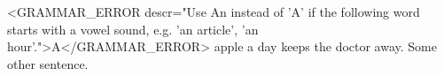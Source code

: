 
    <GRAMMAR_ERROR descr="Use An instead of 'A' if the following word starts with a vowel sound, e.g. 'an article', 'an hour'.">A</GRAMMAR_ERROR> apple a day keeps the doctor away.
    Some other sentence.
